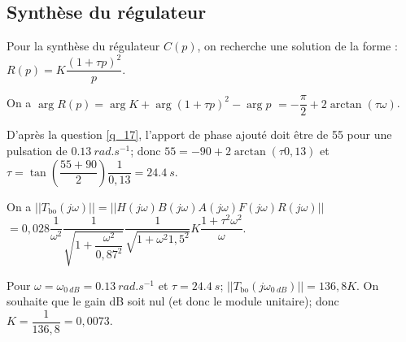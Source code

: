 \else
\fi

\subsection{\label{sec:3:C} Synthèse du régulateur}

Pour la synthèse du régulateur $C(p)$, on recherche une solution de la forme : $R(p)=K \dfrac{\left(1+\tau p\right)^2}{p}$.

\ifprof
\begin{corrige}
On a $\arg{R(p)} = \arg{K}+ \arg{\left(1+\tau p\right)^2} - \arg{p}$
$ =-\dfrac{\pi}{2}  +2 \arctan\left(\tau \omega \right)$.

D'après la question \ref{q_17}, l'apport de phase ajouté doit être de \SI{55}{\degres} pour une pulsation de $ \SI{0,13}{rad.s^{-1}}$; donc $55=-90  +2 \arctan\left(\tau 0,13 \right) $ et $\tau = \tan \left(\dfrac{55+90}{2}\right) \dfrac{1}{0,13} = \SI{24,4}{s}$.
\end{corrige}
\else
\fi 



\ifprof
\begin{corrige}
On a $||T_{\text{bo}}(j\omega)||=||H(j\omega)B(j\omega)A(j\omega)F(j\omega)R(j\omega)||$
$=0,028 \dfrac{1}{\omega^2}\dfrac{1}{\sqrt{1+\dfrac{\omega^2}{0,87^2}}}\dfrac{1}{\sqrt{1+\omega^2 1,5^2}} K \dfrac{1+\tau^2\omega^2}{\omega}$.

Pour $\omega = \omega_{\SI{0}{dB}}=\SI{0,13}{rad.s^{-1}}$ et $\tau=\SI{24,4}{s}$; 
$||T_{\text{bo}}(j\omega_{\SI{0}{dB}})|| = 136,8 K$. On souhaite que le gain dB soit nul (et donc le module unitaire); donc $K= \dfrac{1}{136,8} = 0,0073$.
\end{corrige}
\else
\fi

